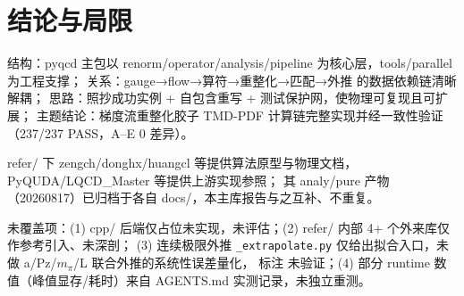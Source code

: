 \documentclass[UTF8]{ctexart}
\begin{document}
\section{结论与局限}
\begin{conclbox}
结构：pyqcd 主包以 renorm/operator/analysis/pipeline 为核心层，tools/parallel 为工程支撑；
关系：gauge→flow→算符→重整化→匹配→外推 的数据依赖链清晰解耦；
思路：照抄成功实例 + 自包含重写 + 测试保护网，使物理可复现且可扩展；
主题结论：梯度流重整化胶子 TMD-PDF 计算链完整实现并经一致性验证（237/237 PASS，A–E 0 差异）。
\end{conclbox}
\begin{refbox}
refer/ 下 zengch/donghx/huangcl 等提供算法原型与物理文档，PyQUDA/LQCD\_Master 等提供上游实现参照；
其 analy/pure 产物（20260817）已归档于各自 docs/，本主库报告与之互补、不重复。
\end{refbox}
\begin{warnbox}
未覆盖项：(1) cpp/ 后端仅占位未实现，未评估；(2) refer/ 内部 4+ 个外来库仅作参考引入、未深剖；
(3) 连续极限外推 \texttt{\_extrapolate.py} 仅给出拟合入口，未做 a/Pz/$m_\pi$/L 联合外推的系统性误差量化，
标注 \textcolor{warn}{未验证}；(4) 部分 runtime 数值（峰值显存/耗时）来自 AGENTS.md 实测记录，未独立重测。
\end{warnbox}
\end{document}
